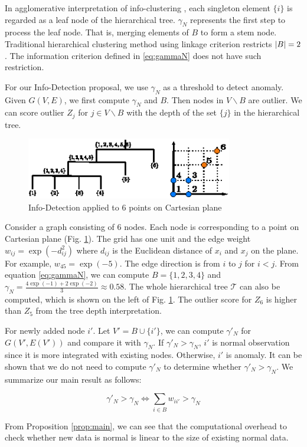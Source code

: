 \documentclass[runningheads]{llncs}
\begin{document}
In agglomerative interpretation of info-clustering \cite{RN8}, each singleton element $\{i\}$ is regarded as a leaf node of the hierarchical tree. $\gamma_N$ represents the first step to process the leaf node. That is, merging elements of $B$ to form a stem node. Traditional hierarchical clustering method using linkage criterion restricts $\lvert B\rvert=2$. The information criterion defined in \eqref{eq:gammaN} does not have such restriction. 

For our Info-Detection proposal, we use $\gamma_N$ as a threshold to detect anomaly. Given $G(V, E)$, we first compute $\gamma_N$ and $B$. Then nodes in $V\backslash B$  are outlier. We can score outlier $Z_j$ for $j \in V\backslash B$ with the depth of the set $\{j\}$ in the hierarchical tree. 
\begin{example}
	\begin{figure}[!ht]
		\centering
		\includegraphics[width=9cm]{pic/outlier_example.eps}
		\caption{Info-Detection applied to 6 points on Cartesian plane}\label{fig:ex}
	\end{figure}
	Consider a graph consisting of 6 nodes. Each node is corresponding to a point on Cartesian plane (Fig. \ref{fig:ex}). The grid has one unit and the edge weight $w_{ij} = \exp(-d_{ij}^2)$ where $d_{ij}$ is the Euclidean distance of $x_i$ and $x_j$ on the plane. For example, $w_{45} = \exp(-5)$. The edge direction is from $i$ to $j$ for $i<j$. From equation \eqref{eq:gammaN}, we can compute $B=\{1,2,3,4\}$ and $\gamma_N = \frac{4\exp(-1)+2\exp(-2)}{3}\approx 0.58$. The whole hierarchical tree $\mathcal{T}$ can also be computed, which is shown on the left of Fig. \ref{fig:ex}. The outlier score for $Z_6$ is higher than $Z_5$ from the tree depth interpretation.
\end{example}
For newly added node $i'$. Let $V'=B\cup \{i'\}$, we can compute $\gamma'_N$ for $G(V', E(V'))$ and compare it with $\gamma_N$. If $\gamma'_N>\gamma_N$, $i'$ is normal observation since it is more integrated with existing nodes. Otherwise, $i'$ is anomaly. It can be shown that we do not need to compute $\gamma'_N$ to determine whether $\gamma'_N>\gamma_N$. We summarize our main result as follows:
\begin{proposition}\label{prop:main}
\begin{equation}
\gamma'_N > \gamma_N \iff  \sum_{i \in B} w_{ii'} > \gamma_N 
\end{equation}
\end{proposition}
From Proposition \ref{prop:main}, we can see that the computational overhead to check whether new data is normal is linear to the size of existing normal data. 
\end{document}
